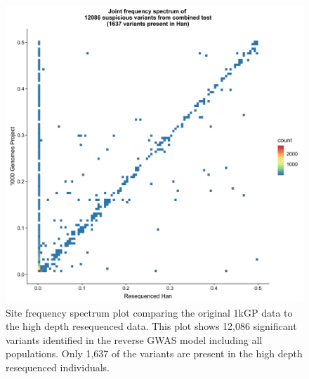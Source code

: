 \documentclass[custompaper]{MBE}%
\begin{document}
\begin{figure}[h]
\centering
\includegraphics[width=12cm,keepaspectratio]{./Figures/Han_1kGP_SFS_FullModel.jpg}
\caption{Site frequency spectrum plot comparing the original 1kGP data to the high depth resequenced data. 
This plot shows  12,086 significant variants identified in the reverse GWAS model including all populations.
 Only 1,637 of the variants are present in the high depth resequenced individuals.}  
\label{90HanSFS_full}
\end{figure}
\end{document}
